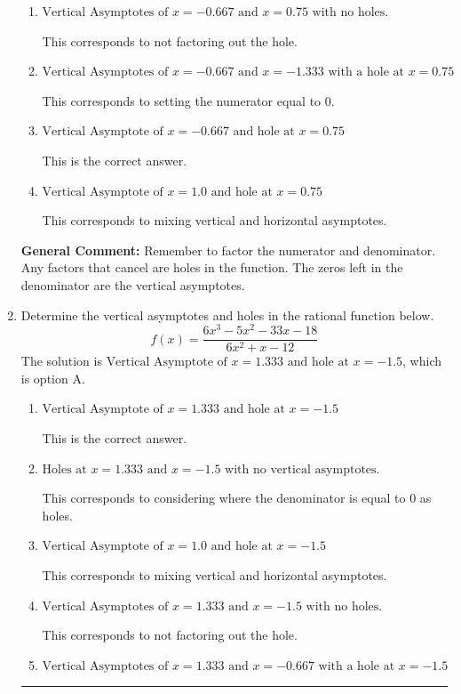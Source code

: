 \documentclass{extbook}[14pt]
\newcommand{\litem}[1]{\item #1

\rule{\textwidth}{0.4pt}}
\begin{document}
\begin{enumerate}
{\begin{enumerate}[label=\Alph*.]
This corresponds to considering where the denominator is equal to 0 as holes.
\item \( \text{Vertical Asymptotes of } x = -0.667 \text{ and } x = 0.75 \text{ with no holes.} \)

This corresponds to not factoring out the hole.
\item \( \text{Vertical Asymptotes of } x = -0.667 \text{ and } x = -1.333 \text{ with a hole at } x = 0.75 \)

This corresponds to setting the numerator equal to 0.
\item \( \text{Vertical Asymptote of } x = -0.667 \text{ and hole at } x = 0.75 \)

This is the correct answer.
\item \( \text{Vertical Asymptote of } x = 1.0 \text{ and hole at } x = 0.75 \)

This corresponds to mixing vertical and horizontal asymptotes.
\end{enumerate}

\textbf{General Comment:} Remember to factor the numerator and denominator. Any factors that cancel are holes in the function. The zeros left in the denominator are the vertical asymptotes.
}
\litem{
Determine the vertical asymptotes and holes in the rational function below.
\[ f(x) = \frac{6x^{3} -5 x^{2} -33 x -18}{6x^{2} +x -12} \]The solution is \( \text{Vertical Asymptote of } x = 1.333 \text{ and hole at } x = -1.5 \), which is option A.\begin{enumerate}[label=\Alph*.]
\item \( \text{Vertical Asymptote of } x = 1.333 \text{ and hole at } x = -1.5 \)

This is the correct answer.
\item \( \text{Holes at } x = 1.333 \text{ and } x = -1.5 \text{ with no vertical asymptotes.} \)

This corresponds to considering where the denominator is equal to 0 as holes.
\item \( \text{Vertical Asymptote of } x = 1.0 \text{ and hole at } x = -1.5 \)

This corresponds to mixing vertical and horizontal asymptotes.
\item \( \text{Vertical Asymptotes of } x = 1.333 \text{ and } x = -1.5 \text{ with no holes.} \)

This corresponds to not factoring out the hole.
\item \( \text{Vertical Asymptotes of } x = 1.333 \text{ and } x = -0.667 \text{ with a hole at } x = -1.5 \)


\end{enumerate}}
\end{enumerate}
\end{document}
